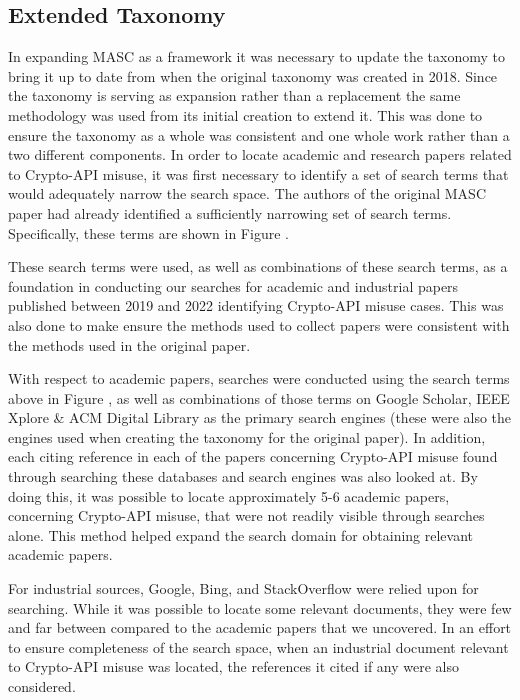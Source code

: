 \subsection{Extended Taxonomy}
\label{ch2:sec:taxonomy}

In expanding MASC as a framework it was necessary to update the taxonomy to bring it up to date from when the original taxonomy was created in 2018. Since the taxonomy is serving as expansion rather than a replacement the same methodology was used from its initial creation to extend it. This was done to ensure the taxonomy as a whole was consistent and one whole work rather than a two different components. In order to locate academic and research papers related to Crypto-API misuse, it was first necessary to identify a set of search terms that would adequately narrow the search space. The authors of the original MASC paper had already identified a sufficiently narrowing set of search terms.  Specifically, these terms are shown in Figure .

These search terms were used, as well as combinations of these search terms, as a foundation in conducting our searches for academic and industrial papers published between 2019 and 2022 identifying Crypto-API misuse cases. This was also done to make ensure the methods used to collect papers were consistent with the methods used in the original paper.  

With respect to academic papers, searches were conducted using the search terms above in Figure , as well as combinations of those terms on Google Scholar, IEEE Xplore \& ACM Digital Library as the primary search engines (these were also the engines used when creating the taxonomy for the original paper). In addition, each citing reference in each of the papers concerning Crypto-API misuse found through searching these databases and search engines was also looked at.  By doing this, it was possible to locate approximately 5-6 academic papers, concerning Crypto-API misuse, that were not readily visible through searches alone. This method helped expand the search domain for obtaining relevant academic papers.

For industrial sources, Google, Bing, and StackOverflow were relied upon for searching.  While it was possible to locate some relevant documents, they were few and far between compared to the academic papers that we uncovered.  In  an effort to ensure completeness of the search space,  when an industrial document relevant to Crypto-API misuse was located, the references it cited if any were also considered.


